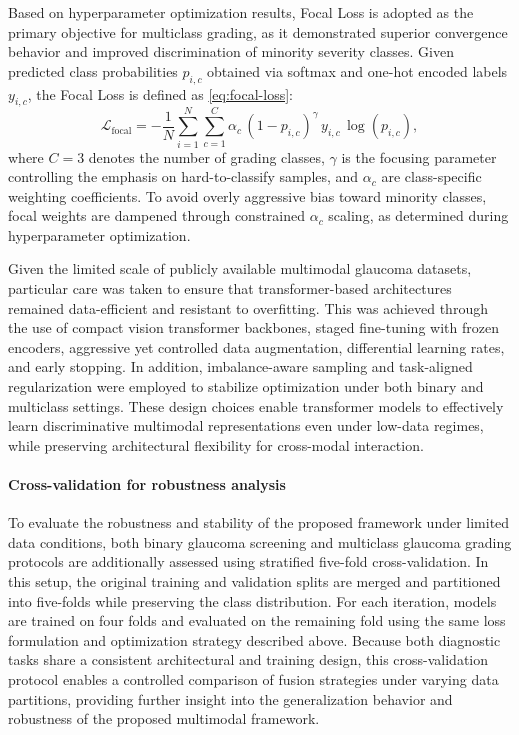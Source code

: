 \documentclass[preprint,12pt]{elsarticle}
\newcommand{\eqrefp}[1]{\eqref{#1}}
\begin{document}
Based on hyperparameter optimization results, Focal Loss is adopted as the primary objective for multiclass grading, as it demonstrated superior convergence behavior and improved discrimination of minority severity classes. Given predicted class probabilities $p_{i,c}$ obtained via softmax and one-hot encoded labels $y_{i,c}$, the Focal Loss is defined as \eqrefp{eq:focal-loss}:
\begin{equation}
    \mathcal{L}_{\text{focal}} =
    -\frac{1}{N}\sum_{i=1}^{N}\sum_{c=1}^{C}
    \alpha_c\,
    (1 - p_{i,c})^{\gamma}\,
    y_{i,c}\,\log(p_{i,c}),
    \label{eq:focal-loss}
\end{equation}
where $C=3$ denotes the number of grading classes, $\gamma$ is the focusing parameter controlling the emphasis on hard-to-classify samples, and $\alpha_c$ are class-specific weighting coefficients. To avoid overly aggressive bias toward minority classes, focal weights are dampened through constrained $\alpha_c$ scaling, as determined during hyperparameter optimization.

Given the limited scale of publicly available multimodal glaucoma datasets, particular care was taken to ensure that transformer-based architectures remained data-efficient and resistant to overfitting. This was achieved through the use of compact vision transformer backbones, staged fine-tuning with frozen encoders, aggressive yet controlled data augmentation, differential learning rates, and early stopping. In addition, imbalance-aware sampling and task-aligned regularization were employed to stabilize optimization under both binary and multiclass settings. These design choices enable transformer models to effectively learn discriminative multimodal representations even under low-data regimes, while preserving architectural flexibility for cross-modal interaction.

\paragraph{Cross-validation for robustness analysis}
To evaluate the robustness and stability of the proposed framework under limited data conditions, both binary glaucoma screening and multiclass glaucoma grading protocols are additionally assessed using stratified five-fold cross-validation. In this setup, the original training and validation splits are merged and partitioned into five-folds while preserving the class distribution. For each iteration, models are trained on four folds and evaluated on the remaining fold using the same loss formulation and optimization strategy described above. Because both diagnostic tasks share a consistent architectural and training design, this cross-validation protocol enables a controlled comparison of fusion strategies under varying data partitions, providing further insight into the generalization behavior and robustness of the proposed multimodal framework.
\end{document}
